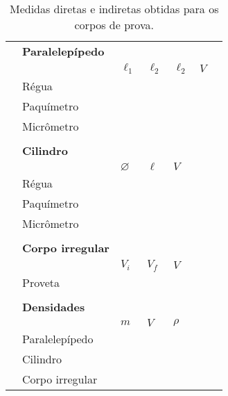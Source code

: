 \begin{table*}[!htpb]
	\label{Tab:DadosMedidasCorposSolidos}
	\begin{center}
	\begin{tabular}{clp{25mm}p{25mm}p{25mm}p{25mm}c}
	\toprule
		&\textbf{Paralelepípedo}\\
		\cmidrule{2-6}
		&& $\ell_1$ & $\ell_2$ & $\ell_2$ & $V$ & \\
		\cmidrule{2-6}	
		&\cellcolor[gray]{0.89}Régua & \cellcolor[gray]{0.92} & \cellcolor[gray]{0.89} & \cellcolor[gray]{0.92} & \cellcolor[gray]{0.89}\\
		&\cellcolor[gray]{0.95}Paquímetro & \cellcolor[gray]{0.97} & \cellcolor[gray]{0.95} & \cellcolor[gray]{0.97} & \cellcolor[gray]{0.95}\\
		&\cellcolor[gray]{0.89}Micrômetro & \cellcolor[gray]{0.92} & \cellcolor[gray]{0.89} & \cellcolor[gray]{0.92} & \cellcolor[gray]{0.89}\\
		\cmidrule{2-6}
\\
		&\textbf{Cilindro} \\
		\cmidrule{2-5}
		&& $\diameter$ & $\ell$ & $V$  \\
		\cmidrule{2-5}
		&\cellcolor[gray]{0.89}Régua & \cellcolor[gray]{0.92} & \cellcolor[gray]{0.89} & \cellcolor[gray]{0.92} \\
		&\cellcolor[gray]{0.95}Paquímetro & \cellcolor[gray]{0.97} & \cellcolor[gray]{0.95} & \cellcolor[gray]{0.97} \\
		&\cellcolor[gray]{0.89}Micrômetro & \cellcolor[gray]{0.92} & \cellcolor[gray]{0.89} & \cellcolor[gray]{0.92} \\
		\cmidrule{2-5}
\\
		&\textbf{Corpo irregular}\\
		\cmidrule{2-5}
		&& $V_i$ & $V_f$ & $V$ \\
		\cmidrule{2-5}
		&\cellcolor[gray]{0.89}Proveta & \cellcolor[gray]{0.92} & \cellcolor[gray]{0.89} & \cellcolor[gray]{0.92}\\
		\cmidrule{2-5}
\\
		&\textbf{Densidades}\\
		\cmidrule{2-5}
		&& $m$ & $V$ & $\rho$ \\
		\cmidrule{2-5}
		&\cellcolor[gray]{0.89}Paralelepípedo & \cellcolor[gray]{0.92} & \cellcolor[gray]{0.89} & \cellcolor[gray]{0.92} \\
		&\cellcolor[gray]{0.95}Cilindro & \cellcolor[gray]{0.97} & \cellcolor[gray]{0.95} & \cellcolor[gray]{0.97} \\
		&\cellcolor[gray]{0.89}Corpo irregular & \cellcolor[gray]{0.92} & \cellcolor[gray]{0.89} & \cellcolor[gray]{0.92} \\
		\cmidrule{2-5}
	\bottomrule
	\end{tabular}
	\end{center}
	\caption{Medidas diretas e indiretas obtidas para os corpos de prova.}
\end{table*}

